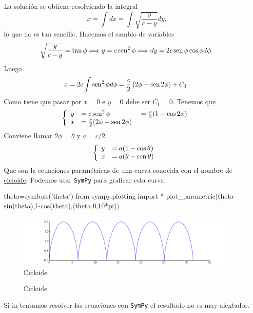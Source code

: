 \begin{subappendices}
La solución se obtiene resolviendo la integral
\[x=\int dx=\int \sqrt{\frac{y}{c-y}}dy.\]
lo que no es tan sencillo. Hacemos el cambio de variables
\[\sqrt{\frac{y}{c-y}}=\tan\phi\Longrightarrow y=c\sen^2\phi\Longrightarrow dy=2c\sen\phi\cos\phi d\phi.\]
Luego
\[x=2c\int\sen^2\phi d\phi=\frac{c}{2}\left(2\phi-\sen 2\phi\right)+C_1.\]
Como tiene que pasar por $x=0$ e $y=0$ debe ser $C_1=0$.  Tenemos que
 \[\left\{\begin{array}{l l l}
	      y&=c\sen^2 \phi&=\frac{c}{2}(1-\cos2\phi)\\
	      x&=\frac{c}{2}(2\phi-\sen2\phi)\ &\\
          \end{array}\right.
\]
Conviene llamar $2\phi=\theta$ y $a=c/2$
 \[\left\{\begin{array}{l l }
	      y&= a(1-\cos\theta)\\
	      x&=a(\theta-\sen\theta)\
          \end{array}\right.
\]
Que son la ecuaciones paramétricas de una curva conocida con el nombre de \href{http://es.wikipedia.org/wiki/Cicloide}{cicloide}. Podemos usar \texttt{SymPy} para graficar esta curva
\begin{pyverbatim}
theta=symbols('theta')
from sympy.plotting import *
plot_parametric(theta-sin(theta),1-cos(theta),(theta,0,10*pi))
\end{pyverbatim}

\begin{figure}[h]
\begin{center}
\includegraphics[scale=.3]{imagenes/cicloide.png}
\end{center}\caption{Cicloide}\label{fig:cicloide}
\end{figure}


\begin{figure}[h]
\begin{center}
\end{center}\caption{Cicloide}\label{fig:cicloide}
\end{figure}


Si in tentamos resolver las ecuaciones con \texttt{SymPy} el resultado no es muy alentador.


\end{subappendices}

